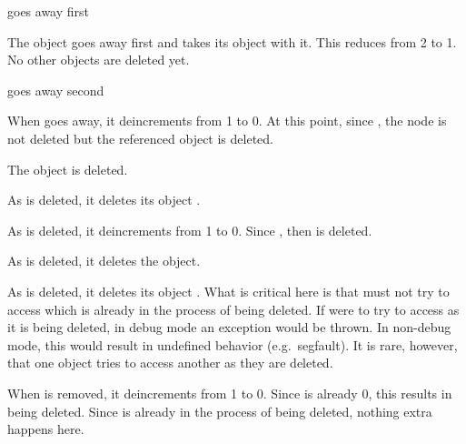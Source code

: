 \documentclass[pdf,ps2pdf,11pt]{SANDreport}
\begin{document}
\begin{description}

{}\item[a)] {} goes away first

  \begin{description}

  {}\item[a.1)] The {} object goes away first and takes
  its {} object {} with it.  This reduces
  {} from 2 to 1.  No other objects are
  deleted yet.

  \end{description}

{}\item[b)] {} goes away second

  \begin{description}

  {}\item[b.1)] When {} goes away, it deincrements
  {} from 1 to 0.  At this point, since
  {}, the node is not deleted but the
  referenced object {} is deleted.

  {}\item[b.2)] The object {} is deleted.

  {}\item[b.3)] As {} is deleted, it deletes its
  {} object {}.

  {}\item[b.4)] As {} is deleted, it deincrements
  {} from 1 to 0. Since
  {}, then {} is deleted.

  {}\item[b.5)] As {} is deleted, it deletes the
  {} object.

  {}\item[b.6)] As {} is deleted, it deletes its {}
  object {}.  What is critical here is that {} must
  not try to access {} which is already in the process of being
  deleted.  If {} were to try to access {} as it is
  being deleted, in debug mode an exception would be thrown.  In
  non-debug mode, this would result in undefined behavior (e.g.\
  segfault).  It is rare, however, that one object tries to access
  another as they are deleted.

  {}\item[b.7)] When {} is removed, it deincrements
  {} from 1 to 0.  Since
  {} is already 0, this results in
  {} being deleted.  Since {} is already in
  the process of being deleted, nothing extra happens here.

  \end{description}

\end{description}
\end{document}
